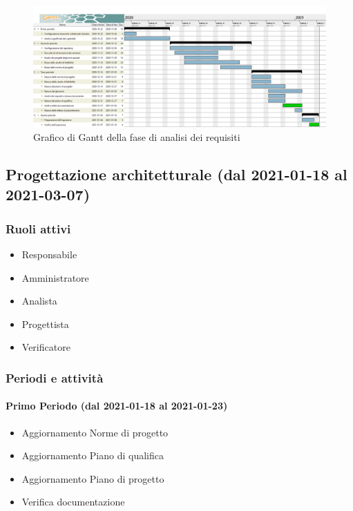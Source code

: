\begin{landscape}
	\begin{figure}[H]
		\centering
		\includegraphics[width=\linewidth]{res/images/ganttFase1.png}
		\caption{Grafico di Gantt della fase di analisi dei requisiti}
		\label{fig:Gantt Analisi dei requisiti}
	\end{figure}
\end{landscape}

\subsection{Progettazione architetturale (dal 2021-01-18 al 2021-03-07)}

\subsubsection{Ruoli attivi}
\begin{itemize}
	\item Responsabile
	\item Amministratore
	\item Analista
	\item Progettista
	\item Verificatore
\end{itemize}

\subsubsection{Periodi e attività}

\paragraph{Primo Periodo (dal 2021-01-18 al 2021-01-23)}
\begin{itemize}
	\item Aggiornamento Norme di progetto
	\item Aggiornamento Piano di qualifica
	\item Aggiornamento Piano di progetto
	\item Verifica documentazione
\end{itemize}

